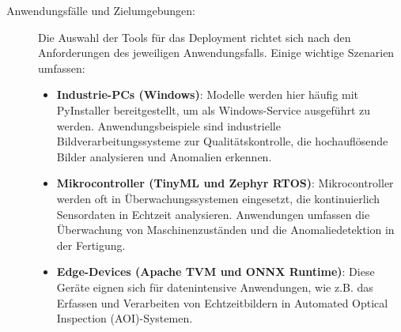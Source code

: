 \begin{description}
    \item[Anwendungsfälle und Zielumgebungen:] Die Auswahl der Tools für das Deployment richtet sich nach den Anforderungen des jeweiligen Anwendungsfalls. Einige wichtige Szenarien umfassen:
    \begin{itemize}
        \item \textbf{Industrie-PCs (Windows)}: Modelle werden hier häufig mit PyInstaller bereitgestellt, um als Windows-Service ausgeführt zu werden. Anwendungsbeispiele sind industrielle Bildverarbeitungssysteme zur Qualitätskontrolle, die hochauflösende Bilder analysieren und Anomalien erkennen.
        \item \textbf{Mikrocontroller (TinyML und Zephyr RTOS)}: Mikrocontroller werden oft in Überwachungssystemen eingesetzt, die kontinuierlich Sensordaten in Echtzeit analysieren. Anwendungen umfassen die Überwachung von Maschinenzuständen und die Anomaliedetektion in der Fertigung.
        \item \textbf{Edge-Devices (Apache TVM und ONNX Runtime)}: Diese Geräte eignen sich für datenintensive Anwendungen, wie z.B. das Erfassen und Verarbeiten von Echtzeitbildern in Automated Optical Inspection (AOI)-Systemen.
    \end{itemize}


\end{description}
